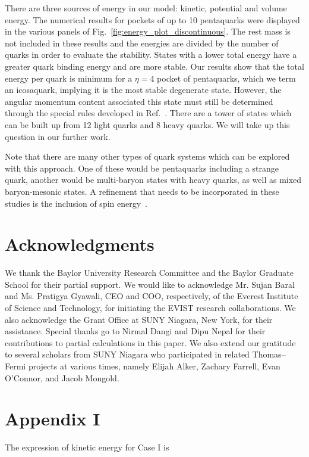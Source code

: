 \documentclass[preprint,12pt]{elsarticle}
\begin{document}
There are three sources of energy in our model: kinetic, potential and volume energy. The numerical results for pockets of up to 10 pentaquarks were displayed in the various panels of Fig.~\ref{fig:energy_plot_discontinuous}. The rest mass is not included in these results and the energies are divided by the number of quarks in order to evaluate the stability. States with a lower total energy have a greater quark binding energy and are more stable. Our results show that the total energy per quark is minimum for a $\eta=4$ pocket of pentaquarks, which we term an icosaquark, implying it is the most stable degenerate state. However, the angular momentum content associated this state must still be determined through the special rules developed in Ref.~\cite{Liu:2012my}. There are a tower of states which can be built up from 12 light quarks and 8 heavy quarks. We will take up this question in our further work.

Note that there are many other types of quark systems which can be explored with this approach. One of these would be pentaquarks including a strange quark, another would be multi-baryon states with heavy quarks, as well as mixed baryon-mesonic states. A refinement that needs to be incorporated in these studies is the inclusion of spin energy~\cite{Liu:2012my}. 


\section{Acknowledgments}
We thank the Baylor University Research Committee and the Baylor Graduate School for their partial support.
We would like to acknowledge Mr. Sujan Baral and Ms. Pratigya Gyawali, CEO and COO, respectively, of the Everest Institute of Science and Technology, for initiating the EVIST research collaborations.
We also acknowledge the Grant Office at SUNY Niagara, New York, for their assistance.
Special thanks go to Nirmal Dangi and Dipu Nepal for their contributions to partial calculations in this paper.
We also extend our gratitude to several scholars from SUNY Niagara who participated in related Thomas–Fermi projects at various times, namely Elijah Alker, Zachary Farrell, Evan O’Connor, and Jacob Mongold.


\appendix
\section{Appendix I} \label{appendix I}
The expression of kinetic energy for Case I is 
%
\end{document}
